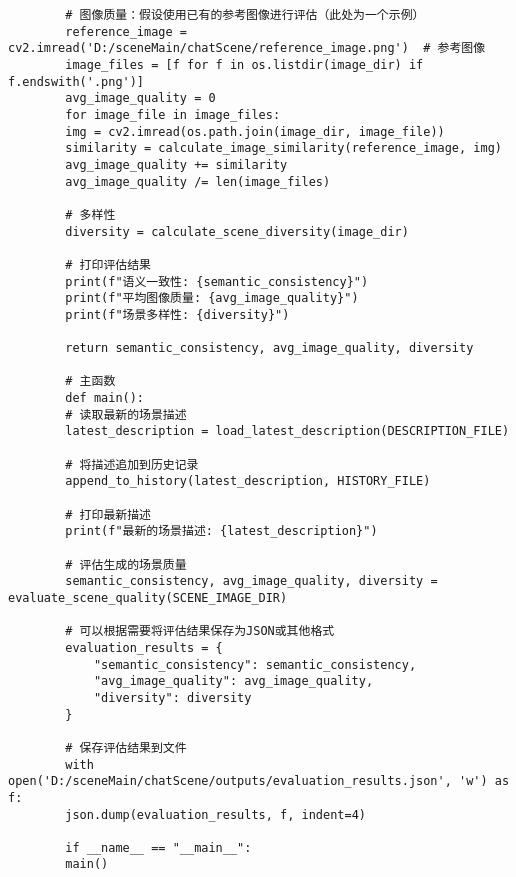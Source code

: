 \begin{lstlisting}
		# 图像质量：假设使用已有的参考图像进行评估（此处为一个示例）
		reference_image = cv2.imread('D:/sceneMain/chatScene/reference_image.png')  # 参考图像
		image_files = [f for f in os.listdir(image_dir) if f.endswith('.png')]
		avg_image_quality = 0
		for image_file in image_files:
		img = cv2.imread(os.path.join(image_dir, image_file))
		similarity = calculate_image_similarity(reference_image, img)
		avg_image_quality += similarity
		avg_image_quality /= len(image_files)
		
		# 多样性
		diversity = calculate_scene_diversity(image_dir)
		
		# 打印评估结果
		print(f"语义一致性: {semantic_consistency}")
		print(f"平均图像质量: {avg_image_quality}")
		print(f"场景多样性: {diversity}")
		
		return semantic_consistency, avg_image_quality, diversity
		
		# 主函数
		def main():
		# 读取最新的场景描述
		latest_description = load_latest_description(DESCRIPTION_FILE)
		
		# 将描述追加到历史记录
		append_to_history(latest_description, HISTORY_FILE)
		
		# 打印最新描述
		print(f"最新的场景描述: {latest_description}")
		
		# 评估生成的场景质量
		semantic_consistency, avg_image_quality, diversity = evaluate_scene_quality(SCENE_IMAGE_DIR)
		
		# 可以根据需要将评估结果保存为JSON或其他格式
		evaluation_results = {
			"semantic_consistency": semantic_consistency,
			"avg_image_quality": avg_image_quality,
			"diversity": diversity
		}
		
		# 保存评估结果到文件
		with open('D:/sceneMain/chatScene/outputs/evaluation_results.json', 'w') as f:
		json.dump(evaluation_results, f, indent=4)
		
		if __name__ == "__main__":
		main()
		
		
\end{lstlisting}
	
